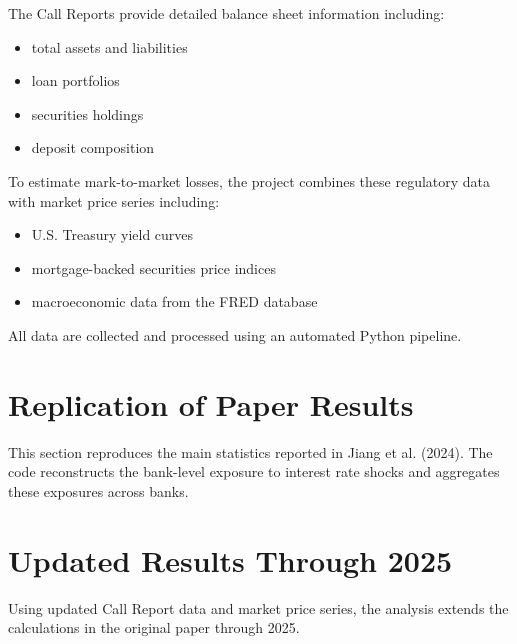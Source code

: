 \documentclass[12pt]{article}
\begin{document}
The Call Reports provide detailed balance sheet information including:

\begin{itemize}
\item total assets and liabilities
\item loan portfolios
\item securities holdings
\item deposit composition
\end{itemize}

To estimate mark-to-market losses, the project combines these regulatory data 
with market price series including:

\begin{itemize}
\item U.S. Treasury yield curves
\item mortgage-backed securities price indices
\item macroeconomic data from the FRED database
\end{itemize}

All data are collected and processed using an automated Python pipeline.

\section{Replication of Paper Results}

This section reproduces the main statistics reported in Jiang et al. (2024). 
The code reconstructs the bank-level exposure to interest rate shocks and 
aggregates these exposures across banks.

\begin{table}[h]
\centering
\caption{Replication of Table 1}

\caption*{Estimated mark-to-market losses across different categories of banks.}
\end{table}

\section{Updated Results Through 2025}

Using updated Call Report data and market price series, the analysis extends 
the calculations in the original paper through 2025.

\begin{table}[h]
\centering
\caption{Updated Market Value Losses}

\caption*{Updated estimates of unrealized losses using data through 2025.}
\end{table}
\end{document}
